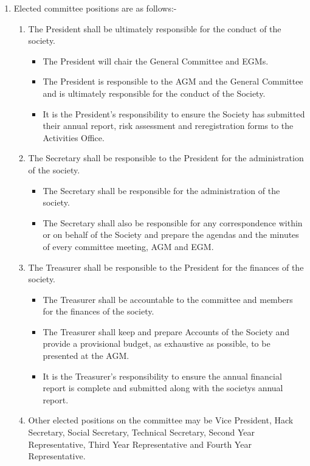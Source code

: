 \begin {enumerate}
  \item Elected committee positions are as follows:-
    \begin{enumerate}
      \item The President shall be ultimately responsible for the conduct of the society.
        \begin{itemize}
          \item The President will chair the General Committee and EGMs.
          \item The President is responsible to the AGM and the General Committee and is ultimately responsible for the conduct of the Society.
          \item It is the President’s responsibility to ensure the Society has submitted their annual report, risk assessment and reregistration forms to the Activities Office.
        \end{itemize}
      \item The Secretary shall be responsible to the President for the administration of the society.
        \begin{itemize}
          \item The Secretary shall be responsible for the administration of the society.
          \item The Secretary shall also be responsible for any correspondence within or on behalf of the Society and prepare the agendas and the minutes of every committee meeting, AGM and EGM.
        \end{itemize}
      \item The Treasurer shall be responsible to the President for the finances of the society.
        \begin{itemize}
          \item The Treasurer shall be accountable to the committee and members for the finances of the society.
          \item The Treasurer shall keep and prepare Accounts of the Society and provide a provisional budget, as exhaustive as possible, to be presented at the AGM.
          \item It is the Treasurer’s responsibility to ensure the annual financial report is complete and submitted along with the society\textquotesingle s annual report.
        \end{itemize}
      \item Other elected positions on the committee may be Vice President, Hack Secretary, Social
        Secretary, Technical Secretary, Second Year Representative,
        Third Year Representative and Fourth Year Representative.
    \end{enumerate}


\end{enumerate}

